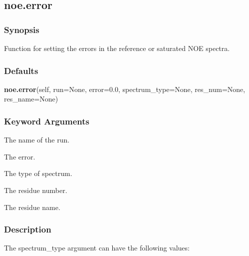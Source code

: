



  

 \newpage 

 \subsection{noe.error} 

  
 \subsubsection{Synopsis} 

 Function for setting the errors in the reference or saturated NOE spectra. 
  

  
 \subsubsection{Defaults} 

 \textsf{\textbf{noe.error}(self, run=None, error=0.0, spectrum\_type=None, res\_num=None, res\_name=None)} 

  
 \subsubsection{Keyword Arguments} 

   The name of the run.   

   The error.   

   The type of spectrum.   

   The residue number.   

   The residue name.  

  

  
 \subsubsection{Description} 

 The spectrum\_type argument can have the following values: 
  

